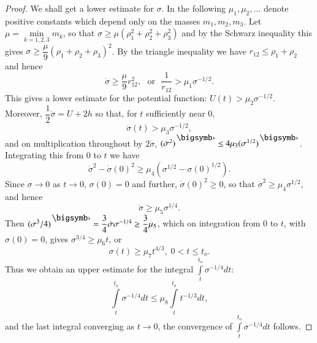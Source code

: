 \begin{proof}
We shall get a lower estimate for $\sigma$. In the following $\mu_1,
\mu_2, \ldots$ denote positive constants which depend only on the
masses $m_1, m_2, m_3$. Let $\mu = \min\limits_{k=1,2,3} m_k$, so that
$\sigma \geq \mu (\rho^2_1 + \rho^2_2 + \rho^2_3)$ and by the Schwarz
inequality this gives $\sigma \geq \dfrac{\mu}{9}(\rho_1 + \rho_2 +
\rho_3)^2 $. By the triangle inequality we have $r_{12} \leq \rho_1 +
\rho_2$ and hence
\begin{equation*}
\dot{\sigma} \geq \frac{\mu}{9} r^2_{12} , \text{~ or ~}
\frac{1}{r_{12}} > \mu_1 \sigma^{-1/2}. \tag{3.1.16}\label{chap3:eq3.1.16}
\end{equation*}
This gives a lower estimate for the potential function: $U(t) >\mu_2
\sigma^{-1/2}$. Moreover, $\dfrac{1}{2} \ddot{\sigma} = U + 2h$ so
that, for $t$ sufficiently near 0,
\begin{equation*}
\ddot{\sigma}(t) > \mu_3 \sigma^{-1/2}, \tag{3.1.17}\label{chap3:eq3.1.17}
\end{equation*}
and on multiplication throughout by $2 \dot{\sigma}$,
${(\dot{\sigma}^2)}^\bigdot \leq 4 \mu_3
{(\sigma^{1/2})}^\bigdot$. Integrating this 
from $0$ to $t$  we have 
$$
\dot{\sigma}^2 - \dot{\sigma}(0)^2 \geq \mu_4 (\sigma^{1/2}  - \sigma
(0)^{1/2}). 
$$\pageoriginale
Since $\sigma \to 0$ as $t\to 0$, $\sigma(0) = 0$ and further,
$\dot{\sigma} (0)^2 \geq 0$, so that $\dot{\sigma}^2 \geq \mu_4
\sigma^{1/2}$, and hence
\begin{equation*}
\dot{\sigma} \geq \mu_5 \sigma^{1/4}. \tag{3.1.18}\label{chap3:eq3.1.18}
\end{equation*}
Then ${(\sigma^3/4)}^\bigdot = \dfrac{3}{4} \dot{\sigma} \sigma^{-1/4} \geq
\dfrac{3}{4} \mu_5$, which on integration from 0 to $t$, with
$\sigma(0) = 0$, gives $\sigma^{3/4} \geq \mu_6 t$, or
\begin{equation*}
\sigma (t) \geq \mu_7 t^{4/3}, \; 0 <t \leq
t_o. \tag{3.1.19}\label{chap3:eq3.1.19} 
\end{equation*}
Thus we obtain an upper estimate for the integral $\int\limits^{t_o}_t
\sigma^{-1/4} dt$: 
$$
\int\limits^{t_o}_t \sigma^{-1/4} dt \leq \mu_8 \int\limits^{t_o}_t
t^{-1/3} dt, 
$$
and the last integral converging as $t \to 0 $, the convergence of
$\int\limits^{t_o}_t \sigma^{-1/4}dt $ follows.


\end{proof}
